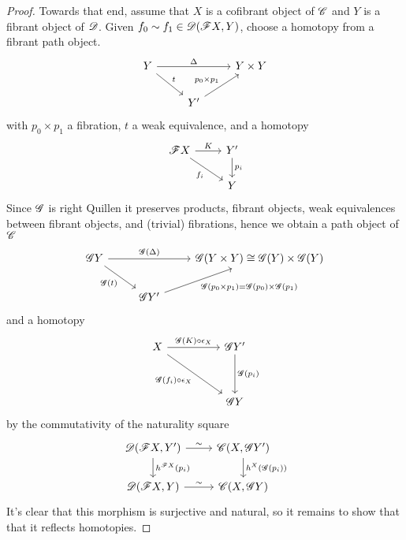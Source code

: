 \documentclass[10pt]{amsart}
\begin{document}
\begin{lem}
\begin{proof}
    
    Towards that end, assume that $X$ is a cofibrant object of $\mathscr{C}$ and $Y$ is a fibrant object of $\mathscr{D}$.
    Given $f_0 \sim f_1 \in \mathscr{D}(\mathscr{F} X, Y)$, choose a homotopy from a fibrant path object.
    $$\begin{tikzcd}
      Y \arrow{rr}{\Delta}\arrow{rd}{t} & & Y \times Y\\
      & Y^\prime \arrow{ur}{p_0 \times p_1}
    \end{tikzcd}$$
    with $p_0 \times p_1$ a fibration, $t$ a weak equivalence, and a homotopy
    $$\begin{tikzcd}
      \F X \arrow{r}{K}\arrow[swap]{rd}{f_i} & Y^\prime \arrow{d}{p_i}\\
      & Y
    \end{tikzcd}$$
    Since $\mathscr{G}$ is right Quillen it preserves products, fibrant objects, weak equivalences between fibrant objects, and (trivial) fibrations, hence we obtain a path object of $\mathscr{C}$
    $$\begin{tikzcd}
      \G Y \arrow{rr}{\G(\Delta)}\arrow[swap]{rd}{\G(t)} && \G(Y \times Y) \cong \G(Y) \times \G(Y)\\
      & \G Y^\prime \arrow[swap]{ur}{\G(p_0 \times p_1) = \G(p_0) \times \G(p_1)}
    \end{tikzcd}$$
    and a homotopy
    $$\begin{tikzcd}
      X \arrow{rr}{\G(K) \circ \epsilon_X}\arrow[swap]{rrdd}{\G(f_i) \circ \epsilon_X} && \G Y^\prime \arrow{dd}{\G(p_i)}\\
      \\
      & & \G Y
    \end{tikzcd}$$
    by the commutativity of the naturality square
    $$\begin{tikzcd}
      \D(\F X, Y^\prime) \arrow{r}{\sim}\arrow{d}{h^{\F X}(p_i)} & \C(X, \G Y^\prime)\arrow{d}{h^X(\G(p_i))}\\
      \D(\F X, Y) \arrow{r}{\sim} & \C(X, \G Y)
    \end{tikzcd}$$
    It's clear that this morphism is surjective and natural, so it remains to show that that it reflects homotopies.
    

\end{proof}
\end{lem}
\end{document}
